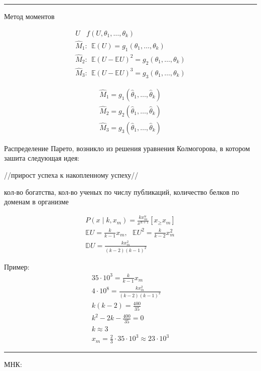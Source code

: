 \documentclass{book}
\begin{document}
\hrule
Метод моментов

\begin{gather*}
  U~~~~f(U,\theta_1,\dots,\theta_k)\\
  \hat{M}_1:~~\mathbb{E}(U)=g_1(\theta_1,\dots, \theta_k)\\
  \hat{M}_2:~~\mathbb{E}(U-\mathbb{E}U)^2=g_2(\theta_1,\dots, \theta_k)\\
  \hat{M}_3:~~\mathbb{E}(U-\mathbb{E}U)^3=g_3(\theta_1,\dots, \theta_k)
\end{gather*}

\begin{gather*}
  \hat{M}_1=g_1(\hat{\theta}_1,\dots,\hat{\theta}_k)\\
  \hat{M}_2=g_2(\hat{\theta}_1,\dots,\hat{\theta}_k)\\
  \hat{M}_3=g_3(\hat{\theta}_1,\dots,\hat{\theta}_k)
\end{gather*}

Распределение Парето, возникло из решения уравнения Колмогорова, в котором зашита следующая идея:

//прирост успеха к накопленному успеху//

кол-во богатства, кол-во ученых по числу публикаций, количество белков по доменам в организме

\begin{gather*}
  P(x\mid k, x_m) = \frac{kx^u_m}{x^{u+1}}[x_\geq x_m]\\
  \mathbb{E}U = \frac{k}{k-1}x_m, ~~~ \mathbb{E}U^2=\frac{k}{k-2}x_m^2\\
  \mathbb{D}U = \frac{kx_m^2}{(k-2)(k-1)^2}
\end{gather*}

Пример:
\begin{gather*}
    35\cdot 10^3=\frac{k}{k-1}x_m\\
    4\cdot 10^8=\frac{kx_m^2}{(k-2)(k-1)^2}\\
    k(k-2)=\frac{400}{35}\\
    k^2-2k-\frac{400}{35}=0\\
    k\approx 3\\
    x_m = \frac{2}{3}\cdot 35\cdot 10^3 \approx 23 \cdot 10^3
\end{gather*}

\hrule
МНК:
\end{document}
